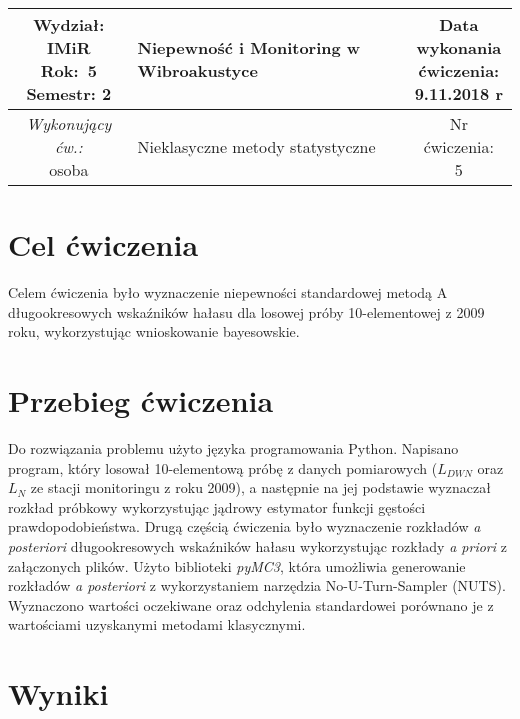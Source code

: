 \documentclass[polish,a4paper,11pt]{mwart}
\let\Oldsection\section
\renewcommand{\section}{\FloatBarrier\Oldsection}
\begin{document}
	\begin{table}[h] %
	\centering
		\begin{tabular}{ | c |  >{\centering\arraybackslash}m{5.5cm} | c | }
			\hline
			\makecell{ \textbf{Wydział:} \\ IMiR \\ \textbf{Rok:}~5 \\ Semestr: 2 } &
			\textbf{\large{Niepewność i Monitoring w Wibroakustyce}} &
			\makecell{Data \\ wykonania \\ ćwiczenia: \\ 9.11.2018 r} \\ \hline
			\makecell{\emph{Wykonujący ćw.:} \\ osoba } &
			\large{Nieklasyczne metody statystyczne} &
			\makecell{Nr ćwiczenia: \\ 5} \\ \hline
		\end{tabular}
	\end{table}

  \section{Cel ćwiczenia}
    Celem ćwiczenia było wyznaczenie niepewności standardowej metodą A
    długookresowych wskaźników hałasu dla losowej próby 10-elementowej z 2009
    roku, wykorzystując wnioskowanie bayesowskie.

  \section{Przebieg ćwiczenia}
    Do rozwiązania problemu użyto języka programowania Python. Napisano
    program, który losował 10-elementową próbę z danych pomiarowych ($L_{DWN}$
    oraz $L_N$ ze stacji monitoringu z roku 2009), a następnie na jej podstawie
    wyznaczał rozkład próbkowy wykorzystując jądrowy estymator funkcji gęstości
    prawdopodobieństwa. 
    Drugą częścią ćwiczenia było wyznaczenie rozkładów \textit{a posteriori}
    długookresowych wskaźników hałasu wykorzystując rozkłady \textit{a priori}
    z załączonych plików. Użyto biblioteki \textit{pyMC3}, która umożliwia
    generowanie rozkładów \textit{a posteriori} z wykorzystaniem narzędzia
    No-U-Turn-Sampler (NUTS). Wyznaczono wartości oczekiwane oraz odchylenia
    standardowei porównano je z wartościami uzyskanymi metodami klasycznymi.

  \section{Wyniki}
\end{document}
